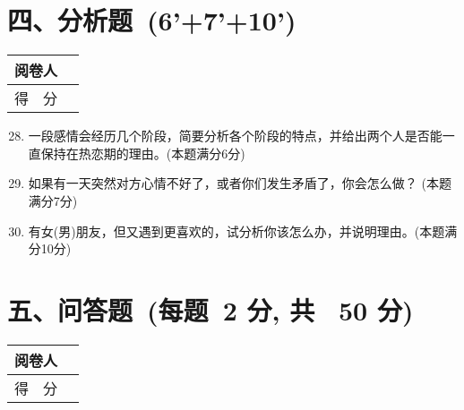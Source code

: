 \documentclass[twocolumn,landscape,UTF8]{ctexart}
\begin{document}
\begin{spacing}{1.3}
\vspace{0.5cm}
		
\section*{\hspace{2cm} 四、分析题~(6'+7'+10')}
		\vspace{-2cm}
		\begin{tabular}{|p{}|p{}|}
			\hline
			\centering  阅卷人&  \\
			\hline
			\centering 得~~分 &  \\
			\hline
		\end{tabular}
		\begin{enumerate}\setcounter{enumi}{27}
		\vspace{0.5cm}
		
\item 一段感情会经历几个阶段，简要分析各个阶段的特点，并给出两个人是否能一直保持在热恋期的理由。(本题满分6分)
		

\item 如果有一天突然对方心情不好了，或者你们发生矛盾了，你会怎么做？
(本题满分7分)
		
\item 有女(男)朋友，但又遇到更喜欢的，试分析你该怎么办，并说明理由。(本题满分10分)	

\end{enumerate}
\vspace{0.5cm}

\section*{\hspace{5cm}五、问答题~(每题~2 分, 共~ 50 分)}
\vspace{-1cm}
\begin{tabular}{|p{}|p{}|}
\hline
\centering 阅卷人& \\
\hline
\centering 得~~分 &  \\
\hline
\end{tabular}
		
\begin{enumerate}\setcounter{enumi}{30}
	

\end{enumerate}
\end{spacing}
\end{document}
